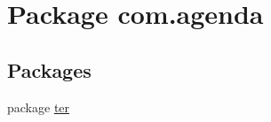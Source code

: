 \hypertarget{namespacecom_1_1agenda}{\section{Package com.\-agenda}
\label{namespacecom_1_1agenda}
}
\subsection*{Packages}
\begin{DoxyCompactItemize}
\item 
package \hyperlink{namespacecom_1_1agenda_1_1ter}{ter}
\end{DoxyCompactItemize}
